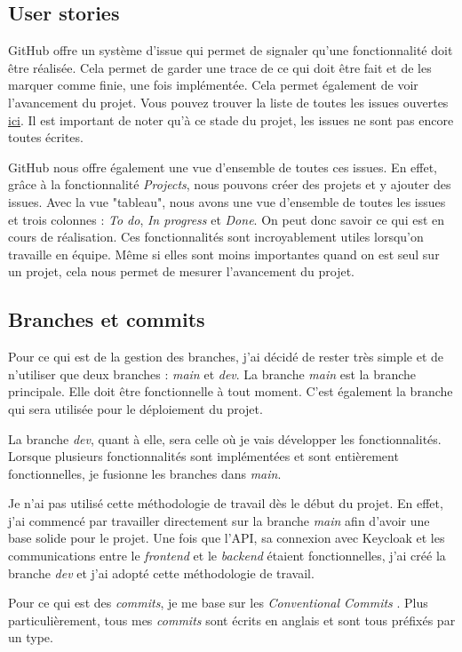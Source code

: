 \subsection{User stories}
GitHub offre un système d'issue qui permet de signaler qu'une fonctionnalité doit être réalisée. Cela permet de garder une trace de ce qui doit être fait et de les marquer comme finie, une fois implémentée. Cela permet également de voir l'avancement du projet. Vous pouvez trouver la liste de toutes les issues ouvertes \href{https://github.com/Marinlestylo/h-quiz/issues}{ici}. Il est important de noter qu'à ce stade du projet, les issues ne sont pas encore toutes écrites.

GitHub nous offre également une vue d'ensemble de toutes ces issues. En effet, grâce à la fonctionnalité \emph{Projects}, nous pouvons créer des projets et y ajouter des issues. Avec la vue "tableau", nous avons une vue d'ensemble de toutes les issues et trois colonnes : \emph{To do}, \emph{In progress} et \emph{Done}. On peut donc savoir ce qui est en cours de réalisation. Ces fonctionnalités sont incroyablement utiles lorsqu'on travaille en équipe. Même si elles sont moins importantes quand on est seul sur un projet, cela nous permet de mesurer l'avancement du projet.

\subsection{Branches et commits}
Pour ce qui est de la gestion des branches, j'ai décidé de rester très simple et de n'utiliser que deux branches : \emph{main} et \emph{dev}. La branche \emph{main} est la branche principale. Elle doit être fonctionnelle à tout moment. C'est également la branche qui sera utilisée pour le déploiement du projet.

La branche \emph{dev}, quant à elle, sera celle où je vais développer les fonctionnalités. Lorsque plusieurs fonctionnalités sont implémentées et sont entièrement fonctionnelles, je fusionne les branches dans \emph{main}.

Je n'ai pas utilisé cette méthodologie de travail dès le début du projet. En effet, j'ai commencé par travailler directement sur la branche \emph{main} afin d'avoir une base solide pour le projet. Une fois que l'API, sa connexion avec Keycloak et les communications entre le \emph{frontend} et le \emph{backend} étaient fonctionnelles, j'ai créé la branche \emph{dev} et j'ai adopté cette méthodologie de travail.

Pour ce qui est des \emph{commits}, je me base sur les \emph{Conventional Commits} \cite{ConventionalCommits}. Plus particulièrement, tous mes \emph{commits} sont écrits en anglais et sont tous préfixés par un type.

